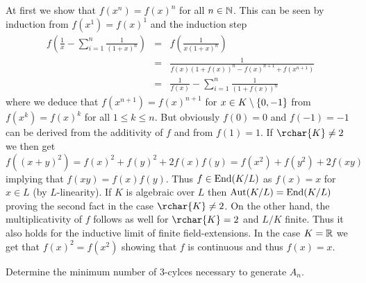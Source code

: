 \documentclass[8pt,a4paper]{article}
\begin{document}
\begin{solution}[\ref{cauchy-f-eq}]
    At first we show that $f(x^n)=f(x)^n$ for all $n\in\mathbb{N}$. This can be seen by induction from $f(x^1)=f(x)^1$ and the induction step
    \begin{eqnarray*}
        f\left(\frac{1}{x}-\sum\limits_{i=1}^n{\frac{1}{{(1+x)}^n}}\right)
        &=& f\left(\frac{1}{x{(1+x)}^n}\right)\\
        &=& \frac{1}{f(x){(1+f(x))}^n-{f(x)}^{n+1}+f(x^{n+1})}\\
        &=& \frac{1}{f(x)}-\sum\limits_{i=1}^n{\frac{1}{{(1+f(x))}^n}}
\end{eqnarray*}
where we deduce that $f(x^{n+1})={f(x)}^{n+1}$ for $x\in K\setminus\set{0,-1}$ from $f(x^k)={f(x)}^k$ for all $1\leq k\leq n$.
But obviously $f(0)=0$ and $f(-1)=-1$ can be derived from the additivity of $f$ and from $f(1)=1$.
If $\rchar{K}\neq 2$ we then get $f({(x+y)}^2)={f(x)}^2+{f(y)}^2+2f(x)f(y)=f(x^2)+f(y^2)+2f(xy)$ implying that $f(xy)=f(x)f(y)$. Thus $f\in\mathop\mathrm{End}\nolimits(K/L)$ as $f(x)=x$ for $x\in L$ (by $L$-linearity).
If $K$ is algebraic over $L$ then $\mathop\mathrm{Aut}\nolimits(K/L)=\mathop\mathrm{End}\nolimits(K/L)$ proving the second fact in the case $\rchar{K}\neq 2$.
On the other hand, the multiplicativity of $f$ follows as well for $\rchar{K}=2$ and $L/K$ finite.
Thus it also holds for the inductive limit of finite field-extensions.
In the case $K=\mathbb{R}$ we get that $f(x)^2=f(x^2)$ showing that $f$ is continuous and thus $f(x)=x$.
\end{solution}

\begin{exercise}\label{3-cycl-an}
    Determine the minimum number of $3$-cylces necessary to generate $A_n$.
\end{exercise}
\end{document}
